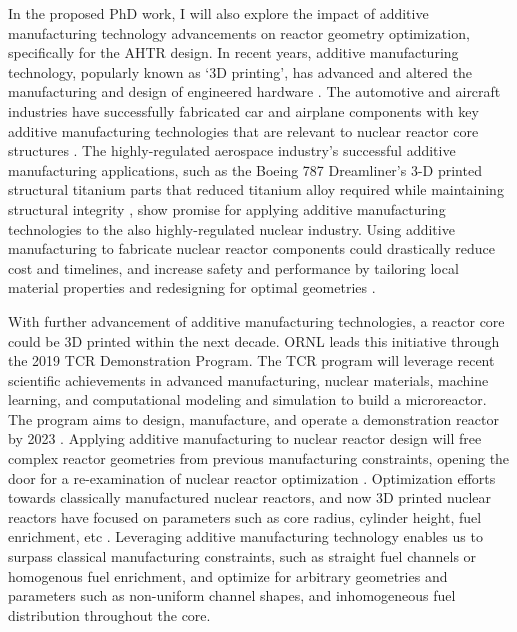In the proposed PhD work, I will also explore the impact of 
additive manufacturing technology advancements on reactor geometry
optimization, specifically for the \gls{AHTR} design.
In recent years, additive manufacturing technology, popularly known as `3D printing', 
has advanced and altered the manufacturing and design of engineered hardware
\cite{simpson_considerations_2019}. 
The automotive and aircraft industries have successfully fabricated car and 
airplane components with key additive manufacturing technologies that are 
relevant to nuclear reactor core structures \cite{murr_frontiers_2016}.  
The highly-regulated aerospace industry's successful additive manufacturing 
applications, such as the Boeing 787 Dreamliner's 3-D printed structural titanium 
parts that reduced titanium alloy required while maintaining structural integrity
\cite{noauthor_printed_2017}, show promise for applying additive manufacturing 
technologies to the also highly-regulated nuclear industry.  
Using additive manufacturing to fabricate nuclear reactor components could 
drastically reduce cost and timelines, and increase safety and performance by 
tailoring local material properties and redesigning for optimal geometries
\cite{simpson_considerations_2019}. 

With further advancement of additive manufacturing technologies, a reactor 
core could be 3D printed within the next decade. 
\gls{ORNL} leads this initiative through the 2019 \gls{TCR} Demonstration 
Program. 
The \gls{TCR} program will leverage recent scientific achievements in advanced 
manufacturing, nuclear materials, machine learning, and computational modeling 
and simulation to build a microreactor. 
The program aims to design, manufacture, and operate a demonstration reactor 
by 2023 \cite{terrani_transformational_2019}. 
Applying additive manufacturing to nuclear reactor design will free complex 
reactor geometries from previous manufacturing constraints,
opening the door for a re-examination of nuclear reactor optimization 
\cite{sobes_artificial_2020}. 
Optimization efforts towards classically manufactured nuclear reactors, and now
3D printed nuclear reactors have focused on parameters such as core radius, 
cylinder height, fuel enrichment, etc 
\cite{sobes_artificial_2020,sacco_two_2006,kumar_new_2015,pereira_parallel_2008}. 
Leveraging additive manufacturing technology enables us to surpass classical 
manufacturing constraints, such as straight fuel channels or homogenous fuel 
enrichment, and optimize for arbitrary geometries and parameters 
such as non-uniform channel shapes, and inhomogeneous fuel distribution 
throughout the core. 

